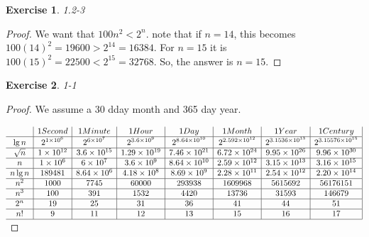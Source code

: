 \documentclass{article}
\newtheorem{th1}{Exercise}
\begin{document}
\begin{th1}\label{ex5}
1.2-3
\end{th1}
\begin{proof}
We want that $100n^2<2^n$. note that if $n=14$, this becomes $100(14)^2=19600 > 2^14  = 16384$. For $n=15$ it is $100(15)^2 = 22500 < 2^{15} = 32768$. So, the answer is $n=15$.

\end{proof}
\begin{th1}\label{ex6}
1-1
\end{th1}
\begin{proof}
We assume a 30 dday month and 365 day year.

$
\begin{array}{c|c|c|c|c|c|c|c|}
&1 Second&1 Minute &1 Hour&1 Day&1 Month&1 Year&1 Century\\
\hline
\lg n& 2^{1\times10^6}&2^{6\times10^7} &2^{3.6\times10^9} &2^{8.64\times10^{10}} &2^{2.592\times10^{12}} & 2^{3.1536\times10^{13} } & 2^{3.15576\times10^{15}} \\
\hline
\sqrt{n} &1\times10^{12} &3.6\times10^{15} &1.29\times10^{19} & 7.46\times10^{21}& 6.72\times10^{24}& 9.95\times10^{26}&9.96\times10^{30} \\
\hline
n &1\times10^6&6\times10^7 &3.6\times10^9 &8.64\times10^{10} &2.59\times10^{12}  & 3.15\times10^{13} & 3.16\times10^{15}\\
\hline
n \lg n & 189481& 8.64\times10^6&4.18\times10^8 &8.69\times10^9 &2.28\times10^{11} & 2.54\times10^{12}&2.20\times10^{14} \\
\hline
n^2 &1000 & 7745& 60000&293938 & 1609968& 5615692& 56176151\\
\hline
n^3 & 100& 391& 1532& 4420& 13736&31593 &146679 \\
\hline
2^n & 19 & 25& 31&36 &41 & 44 &51 \\
\hline
n! & 9&11 & 12& 13& 15& 16& 17\\
\hline
\end{array}
$
\end{proof}
\end{document}
